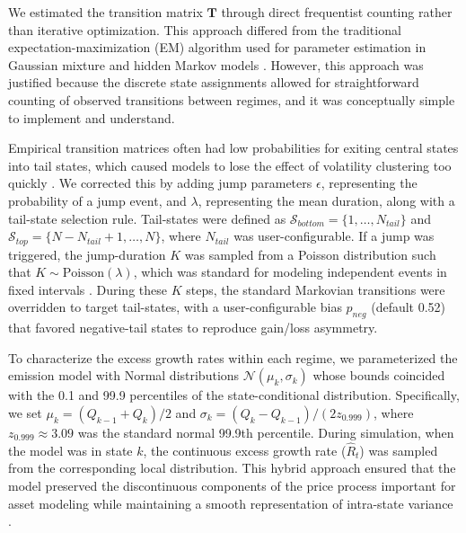 \documentclass[12pt, letterpaper]{article}
\begin{document}
We estimated the transition matrix $\mathbf{T}$ through direct frequentist counting rather than iterative optimization. This approach differed from the traditional expectation-maximization (EM) algorithm used for parameter estimation in Gaussian mixture and hidden Markov models \cite{bilmes_gentle_nodate}. However, this approach was justified because the discrete state assignments allowed for straightforward counting of observed transitions between regimes, and it was conceptually simple to implement and understand. 

Empirical transition matrices often had low probabilities for exiting central states into tail states, which caused models to lose the effect of volatility clustering too quickly \cite{bulla_stylized_2006}. We corrected this by adding jump parameters $\epsilon$, representing the probability of a jump event, and $\lambda$, representing the mean duration, along with a tail-state selection rule. Tail-states were defined as $\mathcal{S}_{bottom} = \{1, \dots, N_{tail}\}$ and $\mathcal{S}_{top} = \{N-N_{tail}+1, \dots, N\}$, where $N_{tail}$ was user-configurable. If a jump was triggered, the jump-duration $K$ was sampled from a Poisson distribution such that $K \sim \text{Poisson}(\lambda)$, which was standard for modeling independent events in fixed intervals \cite{glasserman_monte_2003}. During these $K$ steps, the standard Markovian transitions were overridden to target tail-states, with a user-configurable bias $p_{neg}$ (default 0.52) that favored negative-tail states to reproduce gain/loss asymmetry.

To characterize the excess growth rates within each regime, we parameterized the emission model with Normal distributions $\mathcal{N}(\mu_k, \sigma_k)$ whose bounds coincided with the 0.1 and 99.9 percentiles of the state-conditional distribution. Specifically, we set $\mu_k = (Q_{k-1} + Q_k)/2$ and $\sigma_k = (Q_k - Q_{k-1})/(2 z_{0.999})$, where $z_{0.999} \approx 3.09$ was the standard normal 99.9th percentile. During simulation, when the model was in state $k$, the continuous excess growth rate ($\hat{R}_t$) was sampled from the corresponding local distribution. This hybrid approach ensured that the model preserved the discontinuous components of the price process important for asset modeling while maintaining a smooth representation of intra-state variance \cite{kou_jump-diffusion_2002}.
\end{document}
